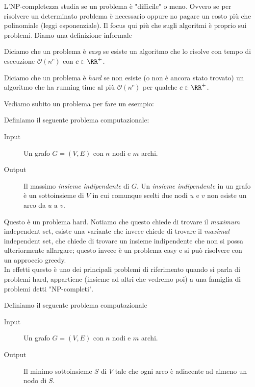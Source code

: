 \documentclass[11pt]{scrartcl}
\newcommand{\bigo}{\mathcal{O}}
\begin{document}
	L'NP-completezza studia se un problema è "difficile" o meno. Ovvero se per risolvere un determinato problema è necessario oppure no pagare un costo più che polinomiale (leggi esponenziale). Il focus qui più che sugli algoritmi è proprio sui problemi. Diamo una definizione informale 
	\begin{definition}
		Diciamo che un problema è \textit{easy} se esiste un algoritmo che lo risolve con tempo di esecuzione $\bigo(n^c)$ con $c\in\RR^+$.
	\end{definition}
	\begin{definition}
		Diciamo che un problema è \textit{hard} se non esiste (o non è ancora stato trovato) un algoritmo che ha running time al più $\bigo(n^c)$ per qualche $c\in\RR^+$. 
	\end{definition}
	Vediamo subito un problema per fare un esempio:
	\begin{example}
		Definiamo il seguente problema computazionale:
		\begin{description}
			\item[Input] Un grafo $G=(V,E)$ con $n$ nodi e $m$ archi.
			\item[Output] Il massimo \textit{insieme indipendente} di $G$. Un \textit{insieme indipendente} in un grafo è un sottoinsieme di $V$ in cui comunque scelti due nodi $u$ e $v$ non esiste un arco da $u$ a $v$.
		\end{description}
	\end{example}
	Questo è un problema hard. Notiamo che questo chiede di trovare il \textit{maximum} independent set, esiste una variante che invece chiede di trovare il \textit{maximal} independent set, che chiede di trovare un insieme indipendente che non si possa ulteriormente allargare; questo invece è un problema easy e si può risolvere con un approccio greedy. \\
	In effetti questo è uno dei principali problemi di riferimento quando si parla di problemi hard, appartiene (insieme ad altri che vedremo poi) a una famiglia di problemi detti "NP-completi".
	\begin{example}
		Definiamo il seguente problema computazionale
		\begin{description}
			\item[Input] Un grafo $G=(V,E)$ con $n$ nodi e $m$ archi.
			\item[Output] Il minimo sottoinsieme $S$ di $V$ tale che ogni arco è adiacente ad almeno un nodo di $S$.
		\end{description}
	\end{example}
\end{document}

